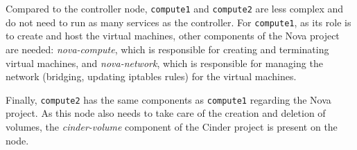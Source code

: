 Compared to the controller node, \texttt{compute1} and \texttt{compute2} are less complex and do not need to run as many services as the controller. 
For \texttt{compute1}, as its role is to create and host the virtual machines, other components of the Nova project are needed: \textit{nova-compute}, which is responsible for creating and terminating virtual machines, and \textit{nova-network}, which is responsible for managing the network (bridging, updating iptables rules) for the virtual machines. 

Finally, \texttt{compute2} has the same components as \texttt{compute1} regarding the Nova project. 
As this node also needs to take care of the creation and deletion of volumes, the \textit{cinder-volume} component of the Cinder project is present on the node. 


